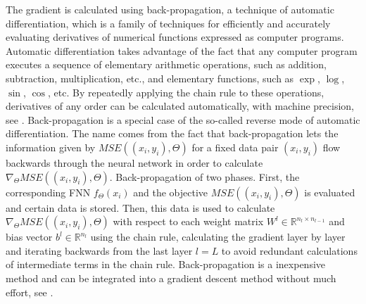 The gradient is calculated using back-propagation, a technique of automatic differentiation, which is a family of techniques for efficiently and accurately evaluating derivatives of numerical functions expressed as computer programs. Automatic differentiation takes advantage of the fact that any computer program executes a sequence of elementary arithmetic operations, such as addition, subtraction, multiplication, etc., and elementary functions, such as $\exp$, $\log$, $\sin$, $\cos$, etc. By repeatedly applying the chain rule to these operations, derivatives of any order can be calculated automatically, with machine precision, see \cite{BaydinPearlmutterAndreyevich:2018}. Back-propagation is a special case of the so-called reverse mode of automatic differentiation. The name comes from the fact that back-propagation lets the information given by $MSE((x_i, y_i), \Theta)$ for a fixed data pair $(x_i, y_i)$ flow backwards through the neural network in order to calculate $\nabla_{\Theta} MSE((x_i, y_i), \Theta)$. Back-propagation of two phases. First, the corresponding FNN $f_{\Theta} \left(x_{i}\right)$ and the objective $MSE((x_i, y_i), \Theta)$ is evaluated and certain data is stored. Then, this data is used to calculate $\nabla_{\Theta} MSE((x_i, y_i), \Theta)$ with respect to each weight matrix $W^l \in \mathbb{R}^{n_l \times n_{l-1}}$ and bias vector $b^l \in \mathbb{R}^{n_l}$ using the chain rule, calculating the gradient layer by layer and iterating backwards from the last layer $l=L$ to avoid redundant calculations of intermediate terms in the chain rule. Back-propagation is a inexpensive method and can be integrated into a gradient descent method without much effort, see \cite[section~6.5]{GoodfellowBengioCourville:2016}.\\

